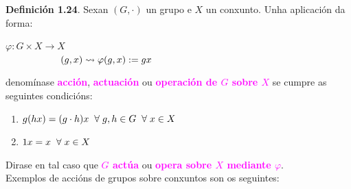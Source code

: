 \documentclass[twoside]{report}
\newcommand{\magbf}[1]{\textcolor{magenta}{\textbf{#1}}} %
\theoremstyle{mystyle}
\begin{document}
\vspace{5mm}

\noindent \textbf{Definición 1.24}. Sexan $(G, \cdot)$ un grupo e $X$ un conxunto. Unha aplicación da forma:\\

\begin{center}
    $\varphi: G \times X \longrightarrow X$ \\
        \vspace{2mm}
    $\hspace{20mm} (g,x) \leadsto \varphi(g,x) := gx$
\end{center}

\noindent denomínase \magbf{acción}, \magbf{actuación} ou \magbf{operación de $G$ sobre $X$} se cumpre as seguintes condicións:

\begin{enumerate}

    \item $g(hx) = (g \cdot h)x \hspace{2mm} \forall \hspace{1mm} g,h \in G \hspace{2mm} \forall \hspace{1mm} x \in X$
    
    \item $1x = x \hspace{2mm} \forall \hspace{1mm} x \in X$
    
\end{enumerate} 

\noindent Dirase en tal caso que \magbf{$G$ actúa} ou \magbf{opera sobre $X$ mediante $\varphi$}.\\

\noindent Exemplos de accións de grupos sobre conxuntos son os seguintes:
\end{document}
